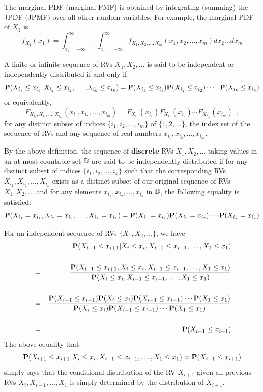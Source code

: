 The marginal PDF (marginal PMF) is obtained by integrating (summing) the JPDF (JPMF) over all other random variables.  
For example, the marginal PDF of $X_1$ is
\[
f_{X_1}(x_1) =
\int_{x_2=-\infty}^{\infty}\cdots \int_{x_m=-\infty}^{\infty} f_{X_1,X_2,\ldots,X_m}(x_1,x_2,\ldots,x_m) dx_2\ldots d x_m 
\]

\begin{definition}\label{D:IndRVs}
A finite or infinite sequence of RVs $X_1,X_2,\ldots$ is said to be independent or independently distributed if and only if
\[
\mathbf{P}(X_{i_1} \leq x_{i_1}, X_{i_2} \leq x_{i_2}, \ldots,  X_{i_k} \leq x_{i_k} ) = \mathbf{P}(X_{i_1} \leq x_{i_1}) \mathbf{P}(X_{i_2} \leq x_{i_2}) \cdots,  \mathbf{P}(X_{i_k} \leq x_{i_k} )
\]
or equivalently,
\[
F_{X_{i_1},X_{i_2},\ldots,X_{i_m}}(x_{i_1},x_{i_2},\ldots,x_{i_m}) = F_{X_{i_1}}(x_{i_1}) F_{X_{i_2}}(x_{i_2}) \cdots F_{X_{i_m}}(x_{i_m}) \enspace ,
\]
for any distinct subset of indices $\{i_1,i_2,\ldots,i_m\}$ of $\{1,2,\ldots\}$, the index set of the sequence of RVs and any sequence of real numbers $x_{i_1},x_{i_2},\ldots,x_{i_m}$.

By the above definition, the sequence of {\bf discrete} RVs $X_1,X_2,\ldots$ taking values in an at most countable set $\mathbb{D}$ are said to be independently distributed if for any distinct subset of indices $\{i_1,i_2,\ldots,i_k\}$ such that the corresponding RVs $X_{i_1},X_{i_2},\ldots,X_{i_k}$ exists as a distinct subset of our original sequence of RVs $X_1,X_2,\ldots$ and for any elements $x_{i_1}, x_{i_2},\ldots,x_{i_k}$ in $\mathbb{D}$, the following equality is satisfied:
\[
\mathbf{P}(X_{i_1}= x_{i_1}, X_{i_2} = x_{i_2}, \ldots,  X_{i_k} = x_{i_k} ) = \mathbf{P}(X_{i_1} = x_{i_1}) \mathbf{P}(X_{i_2} = x_{i_2}) \cdots  \mathbf{P}(X_{i_k} = x_{i_k})
\]
\end{definition}
For an independent sequence of RVs $\{X_1,X_2,\ldots\}$, we have
\begin{eqnarray}
&&\mathbf{P}(X_{i+1} \leq x_{i+1} | X_{i} \leq x_{i}, X_{i-1} \leq x_{i-1}, \ldots, X_1 \leq x_1) \notag\\
\notag \\
&=& \frac{\mathbf{P}(X_{i+1} \leq x_{i+1}, X_{i} \leq x_{i}, X_{i-1} \leq x_{i-1}, \ldots, X_1 \leq x_1)}{\mathbf{P}(X_{i} \leq x_{i}, X_{i-1} \leq x_{i-1}, \ldots, X_1 \leq x_1)} \notag \\
\notag \\
&=& \frac{\mathbf{P}(X_{i+1} \leq x_{i+1}) \mathbf{P}(X_{i} \leq x_{i}) \mathbf{P}(X_{i-1} \leq x_{i-1}) \cdots \mathbf{P}(X_1 \leq x_1)}{\mathbf{P}(X_{i} \leq x_{i}) \mathbf{P}(X_{i-1} \leq x_{i-1}) \cdots \mathbf{P}(X_1 \leq x_1)} \notag \\
\notag \\
&=& \mathbf{P}(X_{i+1} \leq x_{i+1}) \notag 
\end{eqnarray}
The above equality that 
\[
\mathbf{P}(X_{i+1} \leq x_{i+1} | X_{i} \leq x_{i}, X_{i-1} \leq x_{i-1}, \ldots, X_1 \leq x_1) =  \mathbf{P}(X_{i+1} \leq x_{i+1}) 
\]
simply says that the conditional distribution of the RV $X_{i+1}$ given all previous RVs $X_i,X_{i-1},\ldots,X_1$ is simply determined by the distribution of $X_{i+1}$.

